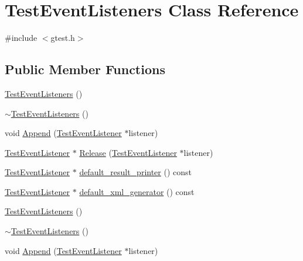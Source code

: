 \hypertarget{classtesting_1_1TestEventListeners}{\section{\-Test\-Event\-Listeners \-Class \-Reference}
\label{db/d70/classtesting_1_1TestEventListeners}
}


{\ttfamily \#include $<$gtest.\-h$>$}

\subsection*{\-Public \-Member \-Functions}
\begin{DoxyCompactItemize}
\item 
\hyperlink{classtesting_1_1TestEventListeners_a0d220264f48a921da04205ae52f77dcc}{\-Test\-Event\-Listeners} ()
\item 
\hyperlink{classtesting_1_1TestEventListeners_a64868cfad376fa452e2f5d27c3a7c37d}{$\sim$\-Test\-Event\-Listeners} ()
\item 
void \hyperlink{classtesting_1_1TestEventListeners_ad98bf37c3296d62b69659734cb6c7cf8}{\-Append} (\hyperlink{classtesting_1_1TestEventListener}{\-Test\-Event\-Listener} $\ast$listener)
\item 
\hyperlink{classtesting_1_1TestEventListener}{\-Test\-Event\-Listener} $\ast$ \hyperlink{classtesting_1_1TestEventListeners_aac8fdc5e2ed8269a0c227dd554b00d27}{\-Release} (\hyperlink{classtesting_1_1TestEventListener}{\-Test\-Event\-Listener} $\ast$listener)
\item 
\hyperlink{classtesting_1_1TestEventListener}{\-Test\-Event\-Listener} $\ast$ \hyperlink{classtesting_1_1TestEventListeners_ae392a6cbcda42ad1406ae496d3fa9e84}{default\-\_\-result\-\_\-printer} () const 
\item 
\hyperlink{classtesting_1_1TestEventListener}{\-Test\-Event\-Listener} $\ast$ \hyperlink{classtesting_1_1TestEventListeners_af9e25abc9e310f09dabc9e833efa97d0}{default\-\_\-xml\-\_\-generator} () const 
\item 
\hyperlink{classtesting_1_1TestEventListeners_a0d220264f48a921da04205ae52f77dcc}{\-Test\-Event\-Listeners} ()
\item 
\hyperlink{classtesting_1_1TestEventListeners_a64868cfad376fa452e2f5d27c3a7c37d}{$\sim$\-Test\-Event\-Listeners} ()
\item 
void \hyperlink{classtesting_1_1TestEventListeners_ad98bf37c3296d62b69659734cb6c7cf8}{\-Append} (\hyperlink{classtesting_1_1TestEventListener}{\-Test\-Event\-Listener} $\ast$listener)

\end{DoxyCompactItemize}
